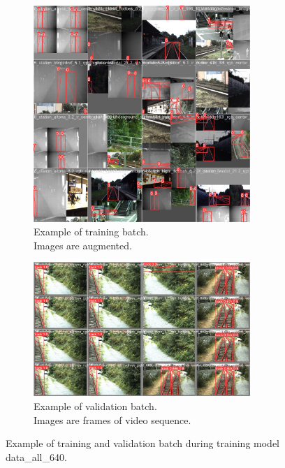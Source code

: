 \documentclass[Master,MDS,english]{BASE/twbook} %
\begin{document}
\begin{figure}
\centering
\begin{subfigure}{.5\textwidth}
  \centering
  \includegraphics[width=0.9\textwidth]{images/yolo/all/train_batch0}
  \caption{Example of training batch.\\ Images are augmented.}
\end{subfigure}%
\begin{subfigure}{.5\textwidth}
  \centering
  \includegraphics[width=0.9\textwidth]{images/yolo/all/val_batch2_pred}
  \caption{Example of validation batch.\\ Images are frames of video sequence.}
  \label{fig:images_from_videos}
\end{subfigure}
\caption{Example of training and validation batch during training model data\_all\_640.}
\label{fig:yolo_all_example}
\end{figure}
\end{document}
